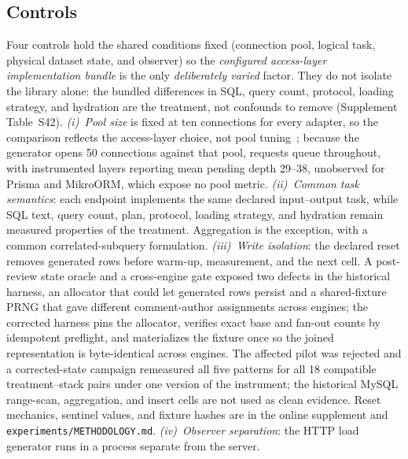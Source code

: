 \subsection{Controls}
Four controls hold the shared conditions fixed (connection pool, logical task, physical dataset state, and observer) so the \emph{configured access-layer implementation bundle} is the only \emph{deliberately varied} factor.
They do not isolate the library alone: the bundled differences in SQL, query count, protocol, loading strategy, and hydration are the treatment, not confounds to remove (Supplement Table~S42).
\emph{(i)~Pool size} is fixed at ten connections for every adapter, so the comparison reflects the access-layer choice, not pool tuning~\cite{gupta2017pooling,laigner2021microservices}; because the generator opens 50 connections against that pool, requests queue throughout, with instrumented layers reporting mean pending depth 29--38, unobserved for Prisma and MikroORM, which expose no pool metric.
\emph{(ii)~Common task semantics}: each endpoint implements the same declared input--output task, while SQL text, query count, plan, protocol, loading strategy, and hydration remain measured properties of the treatment.
Aggregation is the exception, with a common correlated-subquery formulation.
\emph{(iii)~Write isolation}: the declared reset removes generated rows before warm-up, measurement, and the next cell.
A post-review state oracle and a cross-engine gate exposed two defects in the historical harness, an allocator that could let generated rows persist and a shared-fixture PRNG that gave different comment-author assignments across engines; the corrected harness pins the allocator, verifies exact base and fan-out counts by idempotent preflight, and materializes the fixture once so the joined representation is byte-identical across engines.
The affected pilot was rejected and a corrected-state campaign remeasured all five patterns for all 18 compatible treatment--stack pairs under one version of the instrument; the historical MySQL range-scan, aggregation, and insert cells are not used as clean evidence.
Reset mechanics, sentinel values, and fixture hashes are in the online supplement and \texttt{experiments/METHODOLOGY.md}.
\emph{(iv)~Observer separation}: the HTTP load generator runs in a process separate from the server.

